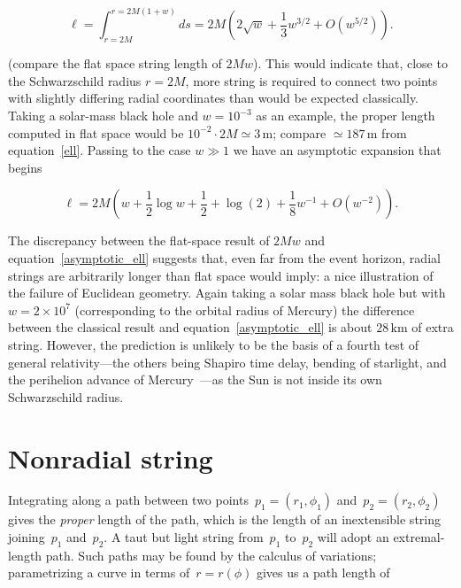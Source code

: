 \documentclass{ws-tpe}
\begin{document}
 \begin{equation}\label{ell}
   \ell =
   \int_{r=2M}^{r=2M(1+w)}ds
   =2M\left(2\sqrt{w} + \frac{1}{3}w^{3/2} + O(w^{5/2})\right).
 \end{equation}

(compare the flat space string length of $2Mw$).  This would indicate
 that, close to the Schwarzschild radius $r=2M$, more string is
 required to connect two points with slightly differing radial
 coordinates than would be expected classically.  Taking a solar-mass
 black hole and $w=10^{-3}$ as an example, the proper length computed
 in flat space would be $10^{-2}\cdot 2M\simeq 3\,\mathrm{m}$; compare
 $\simeq 187\,\mathrm{m}$ from equation~\ref{ell}.  Passing to the
 case $w\gg 1$ we have an asymptotic expansion that begins

% 
\begin{equation}\label{asymptotic_ell}
  \ell = 2M\left(w +  \frac{1}{2}\log w + \frac{1}{2} + \log(2)  +  \frac{1}{8}w^{-1} + O(w^{-2})\right).
\end{equation}


\noindent The discrepancy between the flat-space result of $2Mw$ and
equation~\ref{asymptotic_ell} suggests that, even far from the event
horizon, radial strings are arbitrarily longer than flat space would
imply: a nice illustration of the failure of Euclidean geometry.
Again taking a solar mass black hole but with $w=2\times 10^7$
(corresponding to the orbital radius of Mercury) the difference
between the classical result and equation~\ref{asymptotic_ell} is
about $28\,\mathrm{km}$ of extra string.  However, the prediction is
unlikely to be the basis of a fourth test of general relativity---the
others being Shapiro time delay, bending of starlight, and the
perihelion advance of Mercury~\cite{einstein1916}---as the Sun is not
inside its own Schwarzschild radius.

\section{Nonradial string}
Integrating along a path between two
points~$p_1=\left(r_1,\phi_1\right)$ and~$p_2=\left(r_2,\phi_2\right)$
gives the {\em proper} length of the path, which is the length of an
inextensible string joining~$p_1$ and~$p_2$.  A taut but light string
from~$p_1$ to~$p_2$ will adopt an extremal-length path.  Such paths
may be found by the calculus of variations; parametrizing a curve in
terms of~$r=r\left(\phi\right)$ gives us a path length of
\end{document}
